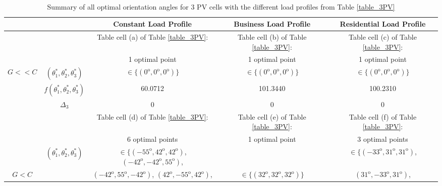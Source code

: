 \begin{table}
\centering
\captionsetup{justification=centering}
\caption{\\ Summary of all optimal orientation angles for 3 PV cells with the different load profiles from Table \ref{table_3PV} \label{opt_3PV}}
  \begin{tabular}
      {c|c||c|c|c} 
			\multicolumn{2}{c||}{ }& Constant Load Profile & Business Load Profile   &  Residential Load Profile  \\
			
      \hline\hline
			
			&&  Table cell (a) of Table \ref{table_3PV}:    &Table cell (b) of Table \ref{table_3PV}:     &Table cell (c) of Table \ref{table_3PV}:     \\  
			  &  &  1 optimal point     & 1 optimal point   &1 optimal point    \\  
				
				$G<<C$ &     $(\theta_1^*,\theta_2^*,\theta_3^*)$      &   $\in \{(0^\mathrm{o},0^\mathrm{o},0^\mathrm{o})\}$      &     $\in \{(0^\mathrm{o},0^\mathrm{o},0^\mathrm{o})\}$&         $\in \{(0^\mathrm{o},0^\mathrm{o},0^\mathrm{o})\}$   \\\cline{2-5}		
				
				&  $f(\theta_1^*,\theta_2^*,\theta_3^*)$  &60.0712& 101.3440&	 100.2310\\\cline{2-5}	
				
				&  $\Delta_3$  &0  &0 &	0\\ \hline
				
				
							&&  Table cell (d) of Table \ref{table_3PV}:    &Table cell (e) of Table \ref{table_3PV}:     &Table cell (f) of Table \ref{table_3PV}:     \\  
	  &&  6 optimal points    &1 optimal point    &3 optimal points   \\ 
				
		
				
		 &	$(\theta_1^*,\theta_2^*,\theta_3^*)$ 	&    $\in \{(-55^\mathrm{o},42^\mathrm{o},42^\mathrm{o})$, $(-42^\mathrm{o},-42^\mathrm{o},55^\mathrm{o})$,   & & 	$\in \{(-33^\mathrm{o},31^\mathrm{o},31^\mathrm{o})$,  \\ 
			 	
	$G<C$ 		 &&     $(-42^\mathrm{o},55^\mathrm{o},-42^\mathrm{o})$, $(42^\mathrm{o},-55^\mathrm{o},42^\mathrm{o})$, &$\in \{(32^\mathrm{o},32^\mathrm{o},32^\mathrm{o})\}$&  $(31^\mathrm{o},-33^\mathrm{o},31^\mathrm{o})$,  \\ 
				

\end{tabular}
\end{table}
